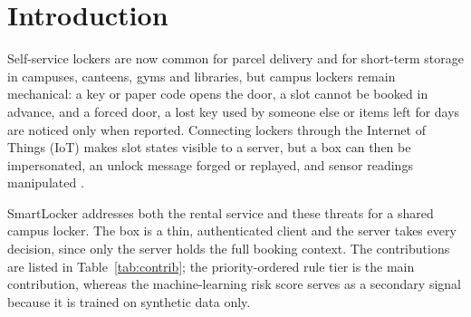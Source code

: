 \documentclass[manuscript,screen]{acmart}
\begin{document}


\maketitle

\section{Introduction}

Self-service lockers are now common for parcel delivery \cite{iwan2016parcel} and for short-term storage in campuses,
canteens, gyms and libraries, but campus lockers remain mechanical: a key or paper code opens the door, a slot cannot be
booked in advance, and a forced door, a lost key used by someone else or items left for days are noticed only when
reported.
Connecting lockers through the Internet of Things (IoT) \cite{alfuqaha2015iot} makes slot states visible to a server,
but a box can then be impersonated, an unlock message forged or replayed, and sensor readings manipulated
\cite{sicari2015security,roman2013features}.

SmartLocker addresses both the rental service and these threats for a shared campus locker. The box is a thin,
authenticated client and the server takes every decision, since only the server holds the full booking context. The
contributions are listed in Table~\ref{tab:contrib}; the priority-ordered rule tier is the main contribution, whereas
the machine-learning risk score serves as a secondary signal because it is trained on synthetic data only.
\end{document}
